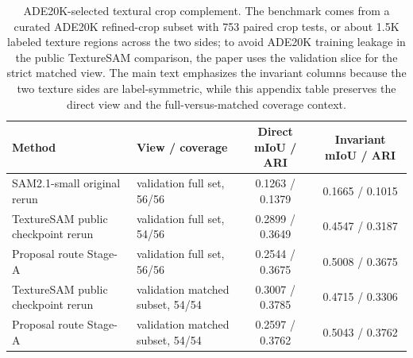 \begin{table}[t]
\centering
\scriptsize
\begin{tabularx}{\textwidth}{@{}Xlcc@{}}
\toprule
Method & View / coverage & Direct mIoU / ARI & Invariant mIoU / ARI \\
\midrule
SAM2.1-small original rerun~\cite{ravi2024sam2} & validation full set, 56/56 & 0.1263 / 0.1379 & 0.1665 / 0.1015 \\
TextureSAM public checkpoint rerun~\cite{texturesamrepo2026} & validation full set, 54/56 & 0.2899 / 0.3649 & 0.4547 / 0.3187 \\
Proposal route Stage-A & validation full set, 56/56 & 0.2544 / 0.3675 & 0.5008 / 0.3675 \\
TextureSAM public checkpoint rerun~\cite{texturesamrepo2026} & validation matched subset, 54/54 & 0.3007 / 0.3785 & 0.4715 / 0.3306 \\
Proposal route Stage-A & validation matched subset, 54/54 & 0.2597 / 0.3762 & 0.5043 / 0.3762 \\
\bottomrule
\end{tabularx}
\caption{ADE20K-selected textural crop complement. The benchmark comes from a curated ADE20K refined-crop subset with 753 paired crop tests, or about 1.5K labeled texture regions across the two sides; to avoid ADE20K training leakage in the public TextureSAM comparison, the paper uses the validation slice for the strict matched view. The main text emphasizes the invariant columns because the two texture sides are label-symmetric, while this appendix table preserves the direct view and the full-versus-matched coverage context.}
\label{tab:detexture_secondary}
\end{table}
